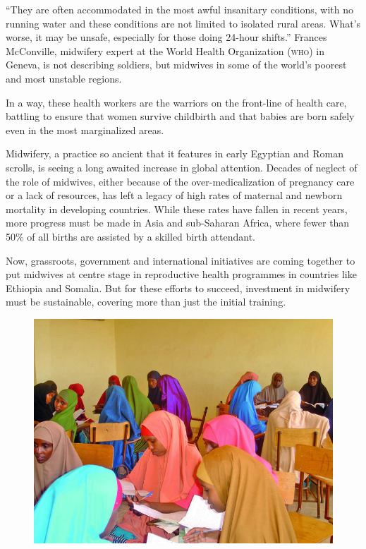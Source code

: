 \documentclass{article}
\begin{document}
“They are often accommodated in the most awful insanitary conditions, with no
running
water and these conditions are not limited to isolated rural areas. What's
worse, it may be
unsafe, especially for those doing 24-hour shifts.” Frances McConville,
midwifery expert at
the World Health Organization (\textsc{who}) in Geneva, is not describing soldiers, but
midwives in some of
the world's poorest and most unstable regions.

In a way, these health workers are the warriors on the front-line of health
care, battling to
ensure that women survive childbirth and that babies are born safely even in the
most marginalized
areas.

Midwifery, a practice so ancient that it features in early Egyptian and Roman
scrolls, is seeing
a long awaited increase in global attention. Decades of neglect of the role of
midwives, either
because of the over-medicalization of pregnancy care or a lack of resources, has
left a legacy of
high rates of maternal and newborn mortality in developing countries. While
these rates have fallen
in recent years, more progress must be made in Asia and sub-Saharan Africa,
where fewer than 50\% of
all births are assisted by a skilled birth attendant.

Now, grassroots, government and international initiatives are coming together to
put midwives at
centre stage in reproductive health programmes in countries like Ethiopia and
Somalia. But for these
efforts to succeed, investment in midwifery must be sustainable, covering more
than just the initial
training.
\begin{figure}
\includegraphics[width=\textwidth]{0042-9686-bwho-91-11-804-Fa}
\caption{}\label{fig:Fa}
\end{figure}
\end{document}
